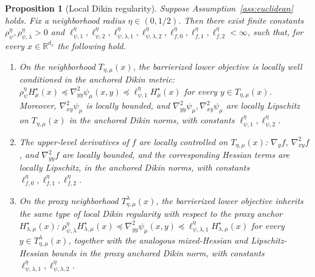 \documentclass{article}
\newtheorem{proposition}{Proposition}
\begin{document}
\begin{proposition}[Local Dikin regularity]
\label{prop:derived_dikin_regularity}
Suppose Assumption~\ref{ass:euclidean} holds. Fix a neighborhood radius
\(\eta\in(0,1/2)\). Then there exist finite constants
\(\rho_{\psi}^{\eta},\rho_{\psi,\lambda}^{\eta}>0\) and
\(\ell_{\psi,1}^{\eta},\ell_{\psi,2}^{\eta},
\ell_{\psi,\lambda,1}^{\eta},\ell_{\psi,\lambda,2}^{\eta},
\ell_{f,0}^{\eta},\ell_{f,1}^{\eta},\ell_{f,2}^{\eta}<\infty\),
such that, for every \(x\in\mathbb R^{d_x}\) the following hold.
\begin{enumerate}[leftmargin=*]
\item[\textup{(i)}]
On the neighborhood \(T_{\eta,\mu}(x)\), the barrierized lower objective is locally well conditioned in
the anchored Dikin metric:
\(\rho_{\psi}^{\eta}H_\mu^\star(x)\preceq
\nabla_{yy}^2\psi_\mu(x,y)\preceq
\ell_{\psi,1}^{\eta}H_\mu^\star(x)\) for every \(y\in T_{\eta,\mu}(x)\).
Moreover, \(\nabla_{xy}^2\psi_\mu\) is locally bounded, and
\(\nabla_{yy}^2\psi_\mu,\nabla_{xy}^2\psi_\mu\) are locally Lipschitz on
\(T_{\eta,\mu}(x)\) in the anchored Dikin norms, with constants
\(\ell_{\psi,1}^{\eta},\ell_{\psi,2}^{\eta}\).

\item[\textup{(ii)}]
The upper-level derivatives of \(f\) are locally controlled on \(T_{\eta,\mu}(x)\):
\(\nabla_y f\), \(\nabla_{xy}^2 f\), and \(\nabla_{yy}^2 f\) are locally bounded, and the
corresponding Hessian terms are locally Lipschitz, in the anchored Dikin norms, with constants
\(\ell_{f,0}^{\eta},\ell_{f,1}^{\eta},\ell_{f,2}^{\eta}\).

\item[\textup{(iii)}]
On the proxy neighborhood \(T_{\eta,\mu}^{\lambda}(x)\), the barrierized lower objective inherits the same
type of local Dikin regularity with respect to the proxy anchor \(H_{\lambda,\mu}^\star(x)\):
\(\rho_{\psi,\lambda}^{\eta}H_{\lambda,\mu}^\star(x)\preceq
\nabla_{yy}^2\psi_\mu(x,y)\preceq
\ell_{\psi,\lambda,1}^{\eta}H_{\lambda,\mu}^\star(x)\) for every
\(y\in T_{\eta,\mu}^{\lambda}(x)\), together with the analogous mixed-Hessian and
Lipschitz-Hessian bounds in the proxy anchored Dikin norm, with constants
\(\ell_{\psi,\lambda,1}^{\eta},\ell_{\psi,\lambda,2}^{\eta}\).
\end{enumerate}
\end{proposition}
\end{document}
